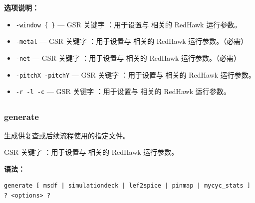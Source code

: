 \textbf{选项说明：}
\begin{itemize}
\item \texttt{-window \{ \}} — GSR 关键字 ：用于设置与  相关的 RedHawk 运行参数。
\item \texttt{-metal} — GSR 关键字 ：用于设置与  相关的 RedHawk 运行参数。（必需）
\item \texttt{-net} — GSR 关键字 ：用于设置与  相关的 RedHawk 运行参数。（必需）
\item \texttt{-pitchX -pitchY} — GSR 关键字 ：用于设置与  相关的 RedHawk 运行参数。
\item \texttt{-r -l -c} — GSR 关键字 ：用于设置与  相关的 RedHawk 运行参数。
\end{itemize}

\subsection{}
\subsubsection*{generate}

生成供复查或后续流程使用的指定文件。

GSR 关键字 ：用于设置与  相关的 RedHawk 运行参数。

\textbf{语法：}
\begin{lstlisting}
generate [ msdf | simulationdeck | lef2spice | pinmap | mycyc_stats ] ? <options> ?
\end{lstlisting}

